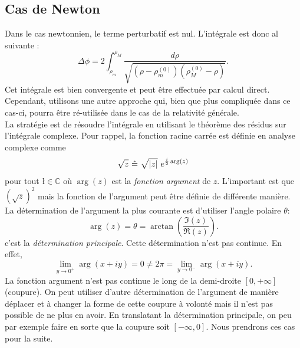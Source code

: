 \documentclass[a4paper,11pt]{report}
\theoremstyle{definition}
\theoremstyle{plain}
\theoremstyle{definition}
\theoremstyle{remark}
\begin{document}
        \subsection{Cas de Newton}
        
            Dans le cas newtonnien, le terme perturbatif est nul. L'intégrale est donc al suivante :
            \begin{equation}
                \Delta\phi = 2\int^{\rho_M}_{\rho_m}\frac{d\rho}{\sqrt{\left( \rho-\rho^{(0)}_m \right)\left( \rho^{(0)}_M-\rho \right)}}.
            \end{equation}
            Cet intégrale est bien convergente et peut être effectuée par calcul direct. Cependant, utilisons une autre approche qui, bien que plus compliquée dans ce cas-ci, pourra être ré-utilisée dans le cas de la relativité générale.\\
            
            La stratégie est de résoudre l'intégrale en utilisant le théorème des résidus sur l'intégrale complexe. Pour rappel, la fonction racine carrée est définie en analyse complexe comme
            \begin{equation}
                \sqrt{z}~\hat{=}~\sqrt{\abs{z}}~e^{\frac{i}{2}\arg(z)}
            \end{equation}
            pour tout $ł\in\mathbb{C}$ où $\arg(z)$ est la \textit{fonction argument} de $z$. L'important est que $(\sqrt{z})^2$ mais la fonction de l'argument peut être définie de différente manière. La détermination de l'argument la plus courante est d'utiliser l'angle polaire $\theta$:
            \begin{equation}
                \arg(z) = \theta = \arctan\left(\frac{\Im(z)}{\Re(z)}\right).
            \end{equation}
            c'est la \textit{détermination principale}. Cette détermination n'est pas continue. En effet, 
            \begin{equation}
                \lim\limits_{y\to0^+} \arg(x+iy) = 0 \neq 2\pi = \lim\limits_{y\to0^-} \arg(x+iy).
            \end{equation}
            La fonction argument n'est pas continue le long de la demi-droite $[0,+\infty]$ (coupure). On peut utiliser d'autre détermination de l'argument de manière déplacer et à changer la forme de cette coupure à volonté mais il n'est pas possible de ne plus en avoir. En translatant la détermination principale, on peu par exemple faire en sorte que la coupure soit $[-\infty,0]$. Nous prendrons ces cas pour la suite.
            
\end{document}
